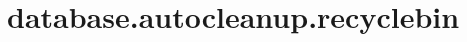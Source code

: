 \section{database.autocleanup.recyclebin}
\label{configuration:DatabaseAutocleanupRecyclebin}
\AvailableInJavaOnly{\TODO}